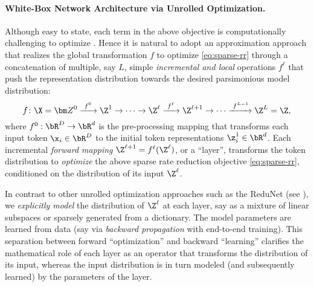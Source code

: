 \documentclass[../../book-main.tex]{subfiles}
\begin{document}
\paragraph{White-Box Network Architecture via Unrolled Optimization.} 


Although easy to state, each term in the above objective is computationally challenging to optimize \cite{Wright-Ma-2022}. Hence it is natural to adopt an approximation approach that realizes the global transformation $f$ to optimize 
\eqref{eq:sparse-rr} through a concatenation of multiple, say $L$, simple \textit{incremental and local} operations $f^\ell$ that push the representation distribution towards the desired parsimonious model distribution:
\begin{equation}
f\colon \X = \bm Z^0 \xrightarrow{\hspace{1mm} f^0 \hspace{1mm}} \Z^1 \rightarrow \cdots \rightarrow \Z^\ell \xrightarrow{\hspace{1mm} f^{\ell} \hspace{1mm}} \Z^{\ell+1} \rightarrow  \cdots \xrightarrow{\hspace{1mm} f^{L-1}} \Z^L = \Z,
\label{eq:incremental}
\end{equation}
where $f^0: \bR^{D} \rightarrow \bR^{d}$ is the pre-processing mapping that transforms each input token $\x_{i} \in \bR^{D}$ to the initial token representations $\z_{i}^{1} \in \bR^{d}$.  
Each incremental \textit{forward mapping} $\Z^{\ell + 1} = f^\ell(\Z^\ell)$, or a ``layer'', transforms the token distribution to \textit{optimize} the above sparse rate reduction objective \eqref{eq:sparse-rr}, conditioned on the distribution of its input $\Z^\ell$. 

\begin{remark}
    In contrast to other unrolled optimization approaches such as the ReduNet (see ), we \textit{explicitly model} the distribution of $\Z^\ell$ at each layer, say as a mixture of linear subspaces or sparsely generated from a dictionary. The model parameters are learned from data (say via \textit{backward propagation} with end-to-end training). This separation between forward ``optimization'' and backward
``learning'' clarifies the mathematical role of each layer as an operator
that transforms the distribution of its input, whereas the input distribution is in turn modeled (and subsequently learned) by the parameters of the layer. 
\end{remark}
\end{document}
